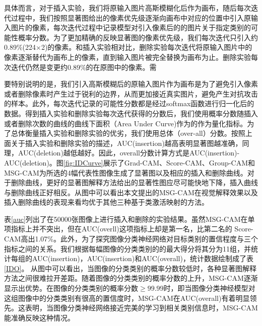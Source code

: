 具体而言，对于插入实验，我们将原输入图片高斯模糊化后作为画布，随后每次迭代过程中，我们按照显著图给出的像素优先级逐渐向画布中对应的位置中引入原输入图片的像素，每次迭代过程中记录模型对引入像素后的的图片关于指定类别的可能性概率分数。为了更加精确的反映显著图的像素优先级，我们每次迭代只引入约0.89\%(224$\times$2)的像素。和插入实验相对比，删除实验每次迭代将原输入图片中的像素逐渐替代为画布上的像素，直到输入图片被完全替换为画布为止。删除实验每次迭代仍然是变更约0.89\%的在原图中的像素。需

要特别说明的是，我们引入高斯模糊后的原输入图片作为画布是为了避免引入像素或者删除像素时产生过于锐利的边界，从而更加接近真实图片，避免产生对抗攻击的样本。此外，每次迭代记录的可能性分数都是经过softmax函数进行归一化后的数据。得到插入实验和删除实验每次迭代获得的分数后，我们使用概率分数随插入或者删除次数的曲线的曲线下面积（Area Under Curve)作为的作为量化指标。为了总体衡量插入实验和删除实验的优劣，我们使用总体（over-all）分数。按照上面关于插入实验和删除实验的描述，AUC(insertion)越高表明显著图越准确，同理，AUC(deletion)越低越好。因此，overall分数计算方式是AUC(insertion)-AUC(deletion)。图\ref{fig:IDCurve}展示了Grad-CAM、Score-CAM、Group-CAM和MSG-CAM为所选的4幅代表性图像生成了显著图以及相应的插入和删除曲线。对于删除曲线，更好的显著图解释方法给出的显著性图应尽可能快地下降，插入曲线与删除曲线正好相反。从图中可以看出本文提出的MSG-CAM在视觉解释效果以及插入删除曲线的表现来看均优于其他三种基于类激活映射的方法。


表\ref{auc}列出了在50000张图像上进行插入和删除的实验结果。虽然MSG-CAM在单项指标上并不突出，但在AUC(overll)这项指标上却是第一名，比第二名的 Score-CAM高出1.07\%。此外，为了探究图像分类神经网络对目标类别的置信程度与三个指标之间的关系。我们根据每幅图像的分类类别的的最大得分将其分为11组，并统计每组的AUC(insertion)，AUC(insertion)和AUC(overall)，统计数据绘制成了表\ref{IDO}。 从图中可以看出，当图像的分类类别的概率分数较低时，各种显著图解释方法之间很难拉开差距。随着图像的分类类别的概率分数的上升，MSG-CAM逐渐显示出优势。在图像的分类类别的概率分数$\geq 99.99$时，即当图像分类神经模型对这组图像中的分类类别有很高的置信度时，MSG-CAM在AUC(overall)有着明显领先。这表明，当图像分类神经网络接近完美的学习到相关类别信息时，MSG-CAM能准确反映这种情况。


